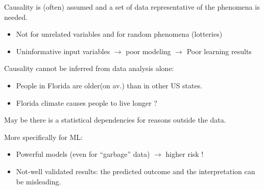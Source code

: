 \documentclass[../main.tex]{subfiles}
\begin{document}
\noindent Causality is (often) assumed and a set of data representative of the phenomena is needed.
\begin{itemize}
    \item Not for unrelated variables and for random phenomena (lotteries)
    \item Uninformative input variables $\rightarrow$ poor modeling $\rightarrow$ Poor learning results
\end{itemize}

\noindent Causality cannot be inferred from data analysis alone:
\begin{itemize}
    \item People in Florida are older(on av.) than in other US states.
    \item Florida climate causes people to live longer ?
\end{itemize}

\noindent May be there is a statistical dependencies for reasons outside the data.

\noindent More specifically for ML:
\begin{itemize}
    \item Powerful models (even for “garbage” data) $\rightarrow$ higher risk !
    \item Not-well validated results: the predicted outcome and the interpretation can be misleading.
\end{itemize}
\end{document}
